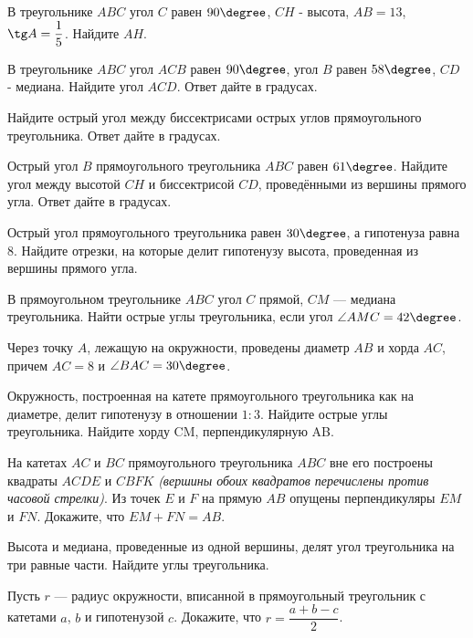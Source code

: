 %
%
\begin{class}[number=2]
	\begin{listofex}
		\item В треугольнике \( ABC \) угол \( C \) равен \( 90\degree \), \(CH\) - высота, \( AB = 13 \), \( \tg A = \dfrac{1}{5} \). Найдите \( AH \).
		\item В треугольнике \( ABC \) угол \( ACB \) равен \( 90\degree \), угол \( B \) равен \( 58 \degree \), \(CD\) - медиана. Найдите угол \( ACD \). Ответ дайте в градусах.
		\item Найдите острый угол между биссектрисами острых углов прямоугольного треугольника. Ответ дайте в градусах.
		\item Острый угол \( B\) прямоугольного треугольника \(ABC\) равен \(61 \degree\). Найдите угол между высотой \(CH\) и биссектрисой \(CD\), проведёнными из вершины прямого угла. Ответ дайте в градусах.
		\item Острый угол прямоугольного треугольника равен \( 30\degree \), а гипотенуза равна \( 8 \). Найдите отрезки, на которые делит гипотенузу высота, проведенная из вершины прямого угла.
		\item В прямоугольном треугольнике \( ABC \) угол \( C \) прямой, \( CM \) --- медиана треугольника. Найти острые углы треугольника, если угол \( \angle AMC = 42\degree \).
		\item Через точку \( A \), лежащую на окружности, проведены диаметр \( AB \) и хорда \( AC \), причем \( AC = 8 \) и \( \angle BAC = 30\degree \).
		\item Окружность, построенная на катете прямоугольного треугольника как на диаметре, делит гипотенузу в отношении \( 1 : 3 \). Найдите острые углы треугольника.
		Найдите хорду CM, перпендикулярную AB.
		\item На катетах \( AC \) и \( BC \) прямоугольного треугольника \( ABC \) вне его построены квадраты \( ACDE \) и \( CBFK \) \textit{(вершины обоих квадратов перечислены против часовой стрелки)}. Из точек \( E \) и \( F \) на прямую \( AB \) опущены перпендикуляры \( EM \) и \( FN \). Докажите, что \( EM + FN = AB \).
		\item Высота и медиана, проведенные из одной вершины, делят угол треугольника на три равные части. Найдите углы треугольника.
		\item Пусть \( r \) --- радиус окружности, вписанной в прямоугольный треугольник с катетами \( a \), \( b \) и гипотенузой \( c \). Докажите, что \( r=\dfrac{a+b-c}{2} \).
	\end{listofex}
\end{class}
